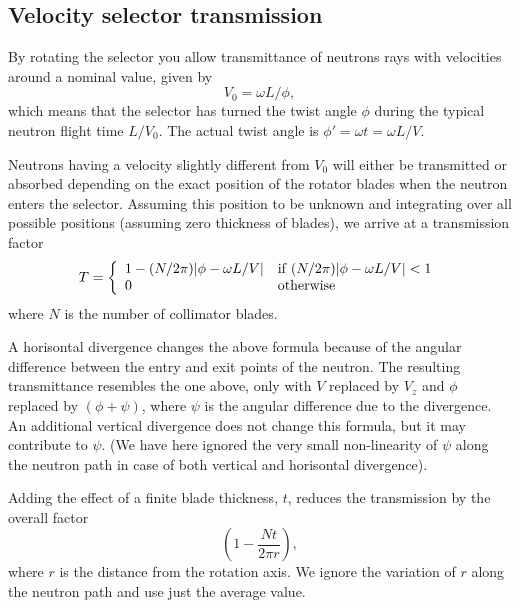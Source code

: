 \subsection{Velocity selector transmission}

By rotating the selector you allow
transmittance of neutrons rays with velocities around a nominal value, given by
\begin{equation}
V_0 = \omega L / \phi ,
\end{equation}
which means that the selector has turned the twist angle
$\phi$ during the typical neutron flight time $L/V_0$. The actual twist angle
is $\phi' = \omega t = \omega L / V$.

Neutrons having a velocity slightly different from $V_0$
will either be transmitted or absorbed depending on the exact position
of the rotator blades when the neutron enters the selector.
Assuming this position to be unknown and integrating over all possible
positions (assuming zero thickness of blades), we arrive at a transmission factor
\begin{equation}
T = \left\{
 \begin{array}{ll}
 1 - (N/2\pi ) |\phi-\omega L / V| &
        {\rm if}\;   (N/2\pi )|\phi -\omega L / V| < 1 \\
    0  &  {\rm otherwise}
 \end{array} \right.
\end{equation}
where $N$ is the number of collimator blades.

A horisontal divergence changes the above formula because of the
angular difference between the entry and exit points of the neutron.
The resulting transmittance resembles the one above, only with
$V$ replaced by $V_z$ and $\phi$ replaced by $(\phi +\psi )$,
where $\psi$ is the angular difference due to
the divergence. An additional vertical divergence does not change
this formula, but it may contribute to $\psi$.
(We have here ignored the very small non-linearity of $\psi$ along the
neutron path in case of both vertical and horisontal divergence).

Adding the effect of a finite blade thickness, $t$, reduces the transmission
by the overall factor
\begin{equation}
\left( 1-\frac{N t}{2\pi r}  \right),
\end{equation}
where $r$ is the distance from the rotation axis. We ignore the variation
of $r$ along the neutron path and use just the average value.


